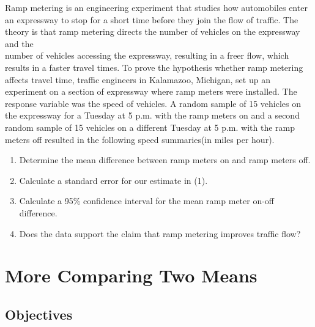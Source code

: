 \documentclass[11pt, chapterprefix=true]{scrbook}\usepackage[]{graphicx}\usepackage[]{color}
\begin{document}
\begin{exercises}
\begin{exercise}
Ramp metering is an engineering experiment that studies how automobiles enter an expressway to stop for a short time before they join the flow of traffic.  The theory is that ramp metering  directs the number of vehicles on the expressway and the \\ number of vehicles accessing the expressway, resulting in a freer flow, which results in a faster travel times.  To prove the hypothesis whether ramp metering affects travel time, traffic engineers in Kalamazoo, Michigan, set up an experiment on a section of expressway where ramp meters were installed.  The response variable was the speed of vehicles.  A random sample of 15 vehicles on the expressway for a Tuesday at 5 p.m. with the ramp meters on and a second random sample of 15 vehicles on a different Tuesday at 5 p.m. with the ramp meters off resulted in the following speed summaries(in miles per hour).

\begin{enumerate}
  \item Determine the mean difference between ramp meters on and ramp meters off.
          
  \item Calculate a standard error for our estimate in (1).
  \item Calculate a 95\% confidence interval for the mean ramp meter on-off difference.
  \item Does the data support the claim that ramp metering improves traffic flow?
\end{enumerate}


\end{exercise}
\begin{solution}  %


\end{solution}


\end{exercises}


\onecolumn












\chapter{More Comparing Two Means}
\label{chap:ch13}

\section{Objectives}
\end{document}
